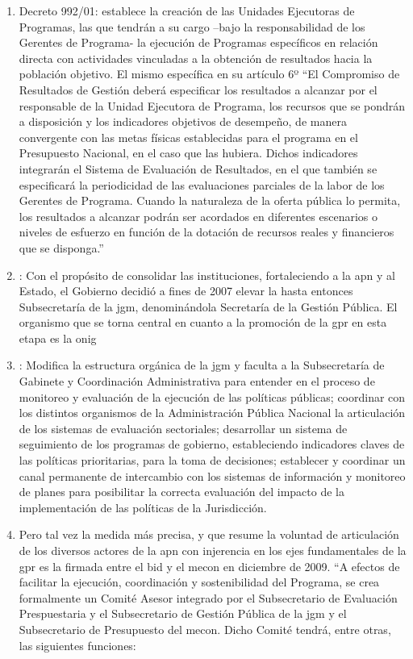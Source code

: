\begin{enumerate}
        \item Decreto 992/01: establece la creación de las Unidades Ejecutoras de Programas, las que tendrán a su cargo –bajo la responsabilidad de los Gerentes de Programa- la ejecución de Programas específicos en relación directa con actividades vinculadas a la obtención de resultados hacia la población objetivo. El mismo específica en su artículo 6º ``El Compromiso de Resultados de Gestión deberá especificar los resultados a alcanzar por el responsable de la Unidad Ejecutora de Programa, los recursos que se pondrán a disposición y los indicadores objetivos de desempeño, de manera convergente con las metas físicas establecidas para el programa en el Presupuesto Nacional, en el caso que las hubiera. Dichos indicadores integrarán el Sistema de Evaluación de Resultados, en el que también se especificará la periodicidad de las evaluaciones parciales de la labor de los Gerentes de Programa. Cuando la naturaleza de la oferta pública lo permita, los resultados a alcanzar podrán ser acordados en diferentes escenarios o niveles de esfuerzo en función de la dotación de recursos reales y financieros que se disponga.''
        \item \textcite{decreto21}: Con el propósito de consolidar las instituciones, fortaleciendo a la \ac{apn} y al Estado, el Gobierno decidió a fines de 2007 elevar la hasta entonces Subsecretaría de la \ac{jgm}, denominándola Secretaría de la Gestión Pública. El organismo que se torna central en cuanto a la promoción de la \ac{gpr} en esta etapa es la \ac{onig}
        \item \textcite{decreto22}: Modifica la estructura orgánica de la \ac{jgm} y faculta a la Subsecretaría de Gabinete y Coordinación Administrativa para entender en el proceso de monitoreo y evaluación de la ejecución de las políticas públicas; coordinar con los distintos organismos de la Administración Pública Nacional la articulación de los sistemas de evaluación sectoriales; desarrollar un sistema de seguimiento de los programas de gobierno, estableciendo indicadores claves de las políticas prioritarias, para la toma de decisiones; establecer y coordinar un canal permanente de intercambio con los sistemas de información y monitoreo de planes para posibilitar la correcta evaluación del impacto de la implementación de las políticas de la Jurisdicción.
        \item Pero tal vez la medida más precisa, y que  resume la voluntad de articulación de los diversos actores de la \ac{apn} con injerencia en los ejes fundamentales de la \ac{gpr} es la \textcite{cartaprodev} firmada entre el \ac{bid} y el \ac{mecon} en diciembre de 2009. ``A efectos de facilitar la ejecución, coordinación y sostenibilidad del Programa, se crea formalmente un Comité Asesor integrado por el Subsecretario de Evaluación Prespuestaria y el Subsecretario de Gestión Pública de la \ac{jgm} y el Subsecretario de Presupuesto del \ac{mecon}. Dicho Comité tendrá, entre otras, las siguientes funciones: 

\end{enumerate}
